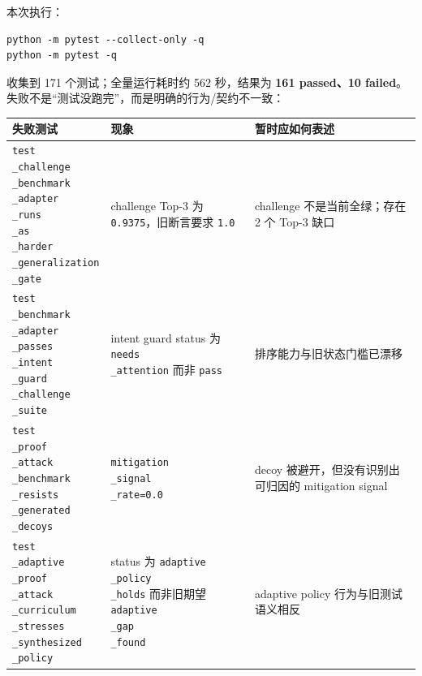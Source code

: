 \documentclass[UTF8,12pt,openany]{ctexbook}
\begin{document}
本次执行：\par

\begin{lstlisting}
python -m pytest --collect-only -q
python -m pytest -q
\end{lstlisting}

收集到 171 个测试；全量运行耗时约 562 秒，结果为 \textbf{161 passed、10 failed}。失败不是“测试没跑完”，而是明确的行为/契约不一致：\par

\begin{center}
\small
\begin{longtable}{|p{}|p{}|p{}|}
\toprule
失败测试 & 现象 & 暂时应如何表述 \\
\midrule
\texttt{test\\_challenge\\_benchmark\\_adapter\\_runs\\_as\\_harder\\_generalization\\_gate} & challenge Top-3 为 \texttt{0.9375}，旧断言要求 \texttt{1.0} & challenge 不是当前全绿；存在 2 个 Top-3 缺口 \\
\texttt{test\\_benchmark\\_adapter\\_passes\\_intent\\_guard\\_challenge\\_suite} & intent guard status 为 \texttt{needs\\_attention} 而非 \texttt{pass} & 排序能力与旧状态门槛已漂移 \\
\texttt{test\\_proof\\_attack\\_benchmark\\_resists\\_generated\\_decoys} & \texttt{mitigation\\_signal\\_rate=0.0} & decoy 被避开，但没有识别出可归因的 mitigation signal \\
\texttt{test\\_adaptive\\_proof\\_attack\\_curriculum\\_stresses\\_synthesized\\_policy} & status 为 \texttt{adaptive\\_policy\\_holds} 而非旧期望 \texttt{adaptive\\_gap\\_found} & adaptive policy 行为与旧测试语义相反 \\

\end{longtable}
\end{center}
\end{document}
